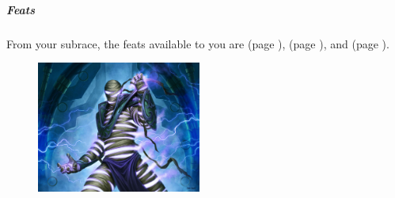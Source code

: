     \subparagraph{Feats} From your subrace, the feats available to you are
    \textbf{} (page \pageref{feat::}),
    \textbf{} (page \pageref{feat::}), and
    \textbf{} (page \pageref{feat::}).

\begin{figure}[!b]
    \centering
    \includegraphics[width=0.48\textwidth]{04kins/img/20zaloth_thunder.jpg}
\end{figure}

\newpage
